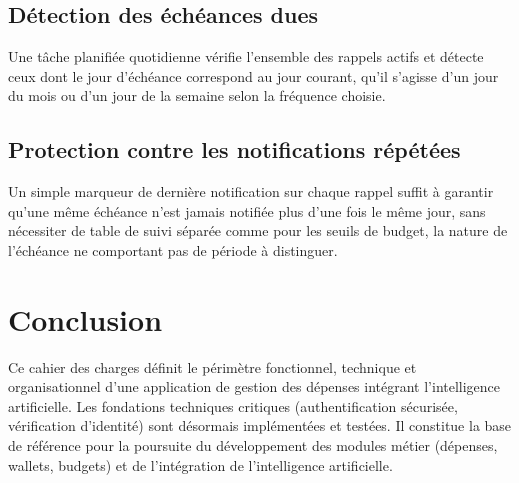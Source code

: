 \documentclass[11pt,a4paper]{article}
\begin{document}
\subsection{Détection des échéances dues}
Une tâche planifiée quotidienne vérifie l'ensemble des rappels actifs et détecte ceux dont le jour d'échéance correspond au jour courant, qu'il s'agisse d'un jour du mois ou d'un jour de la semaine selon la fréquence choisie.

\subsection{Protection contre les notifications répétées}
Un simple marqueur de dernière notification sur chaque rappel suffit à garantir qu'une même échéance n'est jamais notifiée plus d'une fois le même jour, sans nécessiter de table de suivi séparée comme pour les seuils de budget, la nature de l'échéance ne comportant pas de période à distinguer.

\section{Conclusion}
Ce cahier des charges définit le périmètre fonctionnel, technique et organisationnel d'une application de gestion des dépenses intégrant l'intelligence artificielle. Les fondations techniques critiques (authentification sécurisée, vérification d'identité) sont désormais implémentées et testées. Il constitue la base de référence pour la poursuite du développement des modules métier (dépenses, wallets, budgets) et de l'intégration de l'intelligence artificielle.
\end{document}

